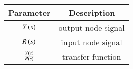 \begin{tabular}{|c|c|}
\hline
\textbf{Parameter} & \textbf{Description}\\ \hline
$Y\left(s\right)$ & output node signal \\ \hline
$R\left(s\right)$ & input node signal \\ \hline
$\frac{Y\left(s\right)}{R\left(s\right)}$ & transfer function \\ \hline
\end{tabular}
